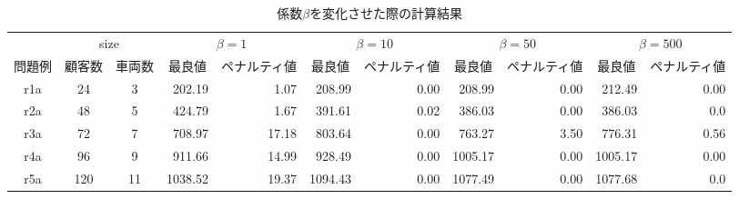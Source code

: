 \begin{landscape}
  \begin{table}[]
  \caption{係数$\beta$を変化させた際の計算結果}
  \label{beta}
  \begin{tabular}{cllrrrrrrrr}
  \hline
  \multicolumn{1}{l}{} & \multicolumn{2}{c}{size}                          & \multicolumn{2}{c}{$\beta=1$}                               & \multicolumn{2}{c}{$\beta=10$}                              & \multicolumn{2}{c}{$\beta=50$}                              & \multicolumn{2}{c}{$\beta=500$}                             \\ \cline{2-11}
  問題例                  & \multicolumn{1}{r}{顧客数} & \multicolumn{1}{r}{車両数} & \multicolumn{1}{c}{最良値} & \multicolumn{1}{c}{ペナルティ値} & \multicolumn{1}{c}{最良値} & \multicolumn{1}{c}{ペナルティ値} & \multicolumn{1}{c}{最良値} & \multicolumn{1}{c}{ペナルティ値} & \multicolumn{1}{c}{最良値} & \multicolumn{1}{c}{ペナルティ値} \\ \cline{2-11}
  r1a                  & \multicolumn{1}{c}{24}  & \multicolumn{1}{c}{3}   & 202.19                        & 1.07                         & 208.99                       & 0.00                      & 208.99                        & 0.00                        & 212.49                        & 0.00                        \\
  r2a                  & \multicolumn{1}{c}{48}  & \multicolumn{1}{c}{5}   & 424.79                        & 1.67                        & 391.61                      & 0.02                        & 386.03                        & 0.00                        & 386.03                        & 0.0                         \\
  r3a                  & \multicolumn{1}{c}{72}  & \multicolumn{1}{c}{7}   & 708.97                        & 17.18                         & 803.64                        & 0.00                       & 763.27                        & 3.50                        & 776.31                        & 0.56                         \\
  r4a                  & \multicolumn{1}{c}{96}  & \multicolumn{1}{c}{9}   & 911.66                        & 14.99                      & 928.49                        & 0.00                        & 1005.17                       & 0.00                     & 1005.17                        & 0.00                        \\
  r5a                  & \multicolumn{1}{c}{120}  & \multicolumn{1}{c}{11}   & 1038.52                       & 19.37                      & 1094.43                        & 0.00                        & 1077.49                       & 0.00                        & 1077.68                        & 0.0                         \\

\end{tabular}
\end{table}
\end{landscape}
